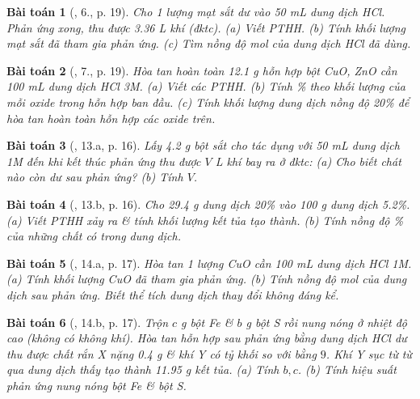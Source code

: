 \documentclass{article}
\newtheorem{baitoan}{Bài toán}
\begin{document}
\begin{baitoan}[\cite{SGK_Hoa_Hoc_9}, 6., p. 19]
	Cho 1 lượng mạt sắt dư vào \emph{50 mL} dung dịch \emph{HCl}. Phản ứng xong, thu được \emph{3.36 L} khí (đktc). (a) Viết PTHH. (b) Tính khối lượng mạt sắt đã tham gia phản ứng. (c) Tìm nồng độ mol của dung dịch \emph{HCl} đã dùng.
\end{baitoan}

\begin{baitoan}[\cite{SGK_Hoa_Hoc_9}, 7., p. 19]
	Hòa tan hoàn toàn \emph{12.1 g} hỗn hợp bột \emph{CuO, ZnO} cần \emph{100 mL} dung dịch \emph{HCl 3M}. (a) Viết các PTHH. (b) Tính \% theo khối lượng của mỗi oxide trong hỗn hợp ban đầu. (c) Tính khối lượng dung dịch \emph{} nồng độ \emph{20\%} để hòa tan hoàn toàn hỗn hợp các oxide trên.
\end{baitoan}

\begin{baitoan}[\cite{An_350_BT_Hoa_Hoc_9}, 13.a, p. 16]
	Lấy \emph{4.2 g} bột sắt cho tác dụng với \emph{50 mL} dung dịch \emph{ 1M} đến khi kết thúc phản ứng thu được $V$ \emph{L} khí \emph{} bay ra ở đktc: (a) Cho biết chát nào còn dư sau phản ứng? (b) Tính $V$.
\end{baitoan}

\begin{baitoan}[\cite{An_350_BT_Hoa_Hoc_9}, 13.b, p. 16]
	Cho \emph{29.4 g} dung dịch \emph{ 20\%} vào \emph{100 g} dung dịch \emph{ 5.2\%}. (a) Viết PTHH xảy ra \& tính khối lượng kết tủa tạo thành. (b) Tính nồng độ \% của những chất có trong dung dịch.
\end{baitoan}

\begin{baitoan}[\cite{An_350_BT_Hoa_Hoc_9}, 14.a, p. 17]
	Hòa tan 1 lượng \emph{CuO} cần \emph{100 mL} dung dịch \emph{HCl 1M}. (a) Tính khối lượng \emph{CuO} đã tham gia phản ứng. (b) Tính nồng độ mol của dung dịch sau phản ứng. Biết thể tích dung dịch thay đổi không đáng kể.
\end{baitoan}

\begin{baitoan}[\cite{An_350_BT_Hoa_Hoc_9}, 14.b, p. 17]
	Trộn $c$ \emph{g} bột \emph{Fe} \& $b$ \emph{g} bột \emph{S} rồi nung nóng ở nhiệt độ cao (không có không khí). Hòa tan hỗn hợp sau phản ứng bằng dung dịch \emph{HCl} dư thu được chất rắn X nặng \emph{0.4 g} \& khí Y có tỷ khối so với \emph{} bằng $9$. Khí Y sục từ từ qua dung dịch \emph{} thấy tạo thành \emph{11.95 g} kết tủa. (a) Tính $b,c$. (b) Tính hiệu suất phản ứng nung nóng bột \emph{Fe} \& bột \emph{S}.
\end{baitoan}
\end{document}
